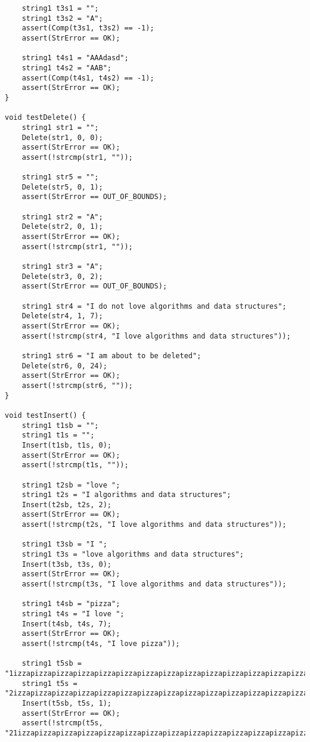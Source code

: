 \documentclass[a4paper,14pt]{extarticle}
\begin{document}
\begin{enumerate}
\begin{verbatim}
    string1 t3s1 = "";
    string1 t3s2 = "A";
    assert(Comp(t3s1, t3s2) == -1);
    assert(StrError == OK);

    string1 t4s1 = "AAAdasd";
    string1 t4s2 = "AAB";
    assert(Comp(t4s1, t4s2) == -1);
    assert(StrError == OK);
}

void testDelete() {
    string1 str1 = "";
    Delete(str1, 0, 0);
    assert(StrError == OK);
    assert(!strcmp(str1, ""));

    string1 str5 = "";
    Delete(str5, 0, 1);
    assert(StrError == OUT_OF_BOUNDS);

    string1 str2 = "A";
    Delete(str2, 0, 1);
    assert(StrError == OK);
    assert(!strcmp(str1, ""));

    string1 str3 = "A";
    Delete(str3, 0, 2);
    assert(StrError == OUT_OF_BOUNDS);

    string1 str4 = "I do not love algorithms and data structures";
    Delete(str4, 1, 7);
    assert(StrError == OK);
    assert(!strcmp(str4, "I love algorithms and data structures"));

    string1 str6 = "I am about to be deleted";
    Delete(str6, 0, 24);
    assert(StrError == OK);
    assert(!strcmp(str6, ""));
}

void testInsert() {
    string1 t1sb = "";
    string1 t1s = "";
    Insert(t1sb, t1s, 0);
    assert(StrError == OK);
    assert(!strcmp(t1s, ""));

    string1 t2sb = "love ";
    string1 t2s = "I algorithms and data structures";
    Insert(t2sb, t2s, 2);
    assert(StrError == OK);
    assert(!strcmp(t2s, "I love algorithms and data structures"));

    string1 t3sb = "I ";
    string1 t3s = "love algorithms and data structures";
    Insert(t3sb, t3s, 0);
    assert(StrError == OK);
    assert(!strcmp(t3s, "I love algorithms and data structures"));

    string1 t4sb = "pizza";
    string1 t4s = "I love ";
    Insert(t4sb, t4s, 7);
    assert(StrError == OK);
    assert(!strcmp(t4s, "I love pizza"));

    string1 t5sb = "1izzapizzapizzapizzapizzapizzapizzapizzapizzapizzapizzapizzapizzapizzapizzapizzapizzapizzapizzapizzapizzapizzapizzapizzapizzapizzapizzapizzapizzapizza";
    string1 t5s = "2izzapizzapizzapizzapizzapizzapizzapizzapizzapizzapizzapizzapizzapizzapizzapizzapizzapizzapizzapizzapizza";
    Insert(t5sb, t5s, 1);
    assert(StrError == OK);
    assert(!strcmp(t5s, "21izzapizzapizzapizzapizzapizzapizzapizzapizzapizzapizzapizzapizzapizzapizzapizzapizzapizzapizzapizzapizzapizzapizzapizzapizzapizzapizzapizzapizzapizzaizzapizzapizzapizzapizzapizzapizzapizzapizzapizzapizzapizzapizzapizzapizzapizzapizzapizzapizzapizzapizza"));


\end{verbatim}
\end{enumerate}
\end{document}
